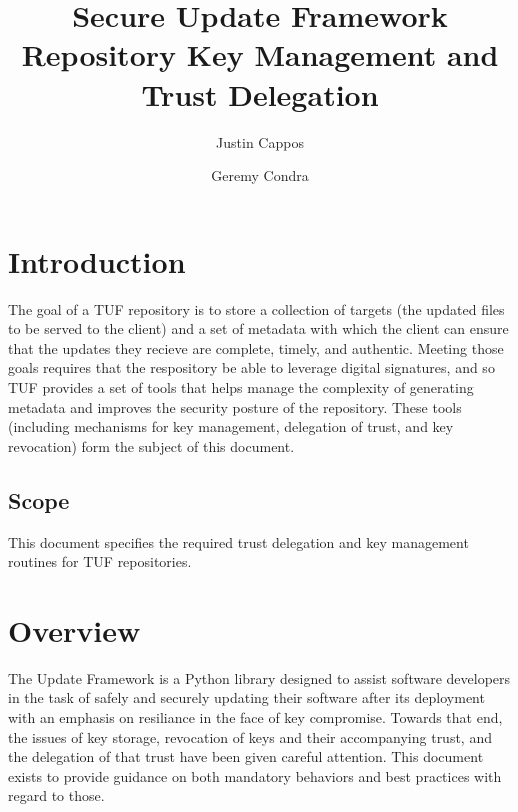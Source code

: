 \documentclass{article}
\begin{document}
\title{Secure Update Framework Repository Key Management and Trust Delegation}
\author{Justin Cappos \and Geremy Condra}
\maketitle


\section{Introduction}
The goal of a TUF repository is to store a collection of targets (the updated files 
to be served to the client) and a set of metadata with which the client can 
ensure that the updates they recieve are complete, timely, and authentic. Meeting 
those goals requires that the respository be able to leverage digital signatures,
and so TUF provides a set of tools that helps manage the complexity of generating 
metadata and improves the security posture of the repository. These tools 
(including mechanisms for key management, delegation of trust, and key revocation) 
form the subject of this document.

\subsection{Scope}
This document specifies the required trust delegation and key management routines
for TUF repositories.

\section{Overview}
The Update Framework is a Python library designed to assist software developers
in the task of safely and securely updating their software after its deployment
with an emphasis on resiliance in the face of key compromise. Towards that end,
the issues of key storage, revocation of keys and their accompanying trust, and
the delegation of that trust have been given careful attention. This document
exists to provide guidance on both mandatory behaviors and best practices with 
regard to those.
\end{document}
